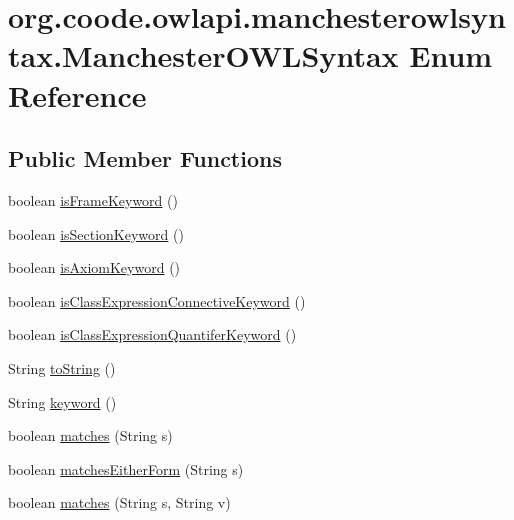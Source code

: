\hypertarget{enumorg_1_1coode_1_1owlapi_1_1manchesterowlsyntax_1_1_manchester_o_w_l_syntax}{\section{org.\-coode.\-owlapi.\-manchesterowlsyntax.\-Manchester\-O\-W\-L\-Syntax Enum Reference}
\label{enumorg_1_1coode_1_1owlapi_1_1manchesterowlsyntax_1_1_manchester_o_w_l_syntax}
}
\subsection*{Public Member Functions}
\begin{DoxyCompactItemize}
\item 
boolean \hyperlink{enumorg_1_1coode_1_1owlapi_1_1manchesterowlsyntax_1_1_manchester_o_w_l_syntax_a3d29b2b846a1ccf1c611b524376efb47}{is\-Frame\-Keyword} ()
\item 
boolean \hyperlink{enumorg_1_1coode_1_1owlapi_1_1manchesterowlsyntax_1_1_manchester_o_w_l_syntax_a0aab8fe2a3bbe12e87b972446b480711}{is\-Section\-Keyword} ()
\item 
boolean \hyperlink{enumorg_1_1coode_1_1owlapi_1_1manchesterowlsyntax_1_1_manchester_o_w_l_syntax_a9c70ddf151dcee98f1c46e533f523216}{is\-Axiom\-Keyword} ()
\item 
boolean \hyperlink{enumorg_1_1coode_1_1owlapi_1_1manchesterowlsyntax_1_1_manchester_o_w_l_syntax_ae8da948483c0caddf344556d56a056a0}{is\-Class\-Expression\-Connective\-Keyword} ()
\item 
boolean \hyperlink{enumorg_1_1coode_1_1owlapi_1_1manchesterowlsyntax_1_1_manchester_o_w_l_syntax_af0ba52e4904380b00c3946e94f0eb3aa}{is\-Class\-Expression\-Quantifer\-Keyword} ()
\item 
String \hyperlink{enumorg_1_1coode_1_1owlapi_1_1manchesterowlsyntax_1_1_manchester_o_w_l_syntax_a5d7be2a66d35bf158187452f57e99e5a}{to\-String} ()
\item 
String \hyperlink{enumorg_1_1coode_1_1owlapi_1_1manchesterowlsyntax_1_1_manchester_o_w_l_syntax_adba7591c1995775c1a4949ea27b3c991}{keyword} ()
\item 
boolean \hyperlink{enumorg_1_1coode_1_1owlapi_1_1manchesterowlsyntax_1_1_manchester_o_w_l_syntax_aa1b3252bfaa1b46f1726c82c41453c59}{matches} (String s)
\item 
boolean \hyperlink{enumorg_1_1coode_1_1owlapi_1_1manchesterowlsyntax_1_1_manchester_o_w_l_syntax_a4a1559650177f9093f8a289a1b23c45f}{matches\-Either\-Form} (String s)
\item 
boolean \hyperlink{enumorg_1_1coode_1_1owlapi_1_1manchesterowlsyntax_1_1_manchester_o_w_l_syntax_ae5b17b6f492d7bce08c4d8c286e75650}{matches} (String s, String v)
\end{DoxyCompactItemize}
